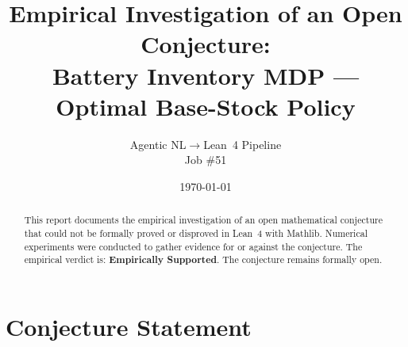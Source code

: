 \documentclass[11pt]{article}
\title{Empirical Investigation of an Open Conjecture:\\
Battery Inventory MDP — Optimal Base-Stock Policy}
\author{Agentic NL$\to$Lean~4 Pipeline \\ \small Job \#51}
\date{\today}
\begin{document}
\maketitle

\begin{abstract}
This report documents the empirical investigation of an open mathematical conjecture
that could not be formally proved or disproved in Lean~4 with Mathlib.
Numerical experiments were conducted to gather evidence for or against the conjecture.
The empirical verdict is: \textbf{\textcolor{green!70!black}{Empirically Supported}}.
The conjecture remains formally open.
\end{abstract}

\section{Conjecture Statement}
\end{document}
